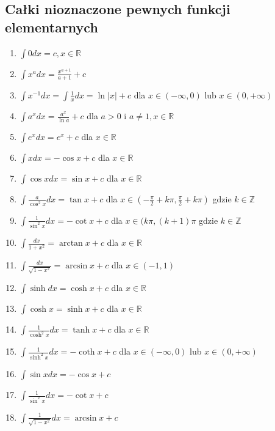 \documentclass[11pt]{article}
\begin{document}
\subsection{Całki nioznaczone pewnych funkcji elementarnych}
\label{sec:orge629bb7}
\begin{enumerate}
\item \(\displaystyle\int 0 dx = c , x \in \mathbb{R}\)
\item \(\displaystyle\int x^{a}dx = \frac{x^{a+1}}{a + 1} +c\)
\item \(\displaystyle\int x^{-1}dx = \int \frac{1}{x}dx = \ln |x| + c\) dla \(x \in ( - \infty,0 )\) lub \(x \in (0, + \infty)\)
\item \(\displaystyle\int a^x dx = \frac{a^x}{\ln a} + c\) dla \(a>0\) i \(a \ne 1, x \in \mathbb{R}\)
\item \(\displaystyle\int e^{x} dx = e^x + c\) dla \(x \in \mathbb{R}\)
\item \(\displaystyle\int x dx = -\cos x +c\) dla \(x \in \mathbb{R}\)
\item \(\displaystyle\int \cos x dx = \sin x + c\) dla \(x \in \mathbb{R}\)
\item \(\displaystyle\int \frac{a}{\cos^2 x}dx = \tan x + c\) dla \(\displaystyle x \in \left( - \frac{\pi}{2} + k \pi, \frac{\pi}{2}+k \pi \right)\) gdzie \(k \in \mathbb{Z}\)
\item \(\displaystyle\int \frac{1}{\sin^2 x}dx = - \cot x+c\) dla \(x \in (k\pi, (k+1)\pi\) gdzie \(k \in \mathbb{Z}\)
\item \(\displaystyle\int \frac{dx}{1 + x^2} = \arctan x + c\) dla \(x \in \mathbb{R}\)
\item \(\displaystyle\int \frac{dx}{\sqrt{1-x^2}} = \arcsin x + c\) dla \(x \in (-1, 1)\)
\item \(\displaystyle\int \sinh dx = \cosh x + c\) dla \(x \in \mathbb{R}\)
\item \(\displaystyle\int \cosh x = \sinh x + c\) dla \(x \in \mathbb{R}\)
\item \(\displaystyle\int \frac{1}{\cosh^2 x} dx = \tanh x + c\) dla \(x \in \mathbb{R}\)
\item \(\displaystyle\int \frac{1}{\sinh^2 x} dx = - \coth x + c\) dla \(x \in ( - \infty , 0 )\) lub \(x \in (0 , + \infty)\)
\item \(\displaystyle\int \sin x dx = -\cos x + c\)
\item \(\displaystyle\int \frac{1}{\sin^2 x}dx = -\cot x + c\)
\item \(\displaystyle\int \frac{1}{\sqrt{1 -x ^2}}dx = \arcsin x + c\)
\end{enumerate}
\end{document}
